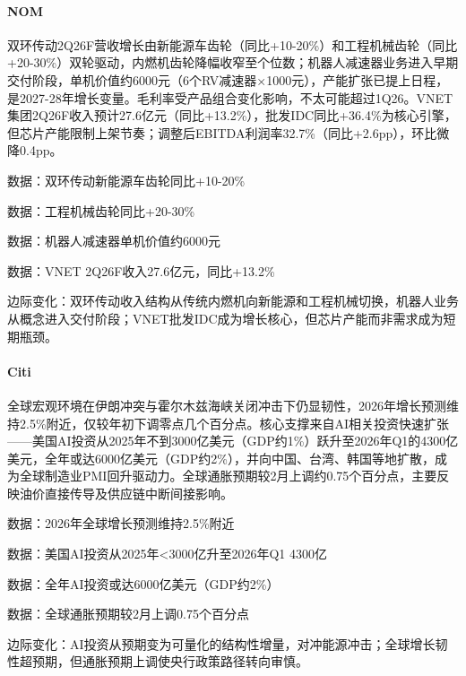 \documentclass[11pt]{ctexart}
\begin{document}
\paragraph{NOM} 双环传动2Q26F营收增长由新能源车齿轮（同比+10-20\%）和工程机械齿轮（同比+20-30\%）双轮驱动，内燃机齿轮降幅收窄至个位数；机器人减速器业务进入早期交付阶段，单机价值约6000元（6个RV减速器×1000元），产能扩张已提上日程，是2027-28年增长变量。毛利率受产品组合变化影响，不太可能超过1Q26。VNET集团2Q26F收入预计27.6亿元（同比+13.2\%），批发IDC同比+36.4\%为核心引擎，但芯片产能限制上架节奏；调整后EBITDA利润率32.7\%（同比+2.6pp），环比微降0.4pp。
{\small\color{refgray}数据：双环传动新能源车齿轮同比+10-20\%\par}
{\small\color{refgray}数据：工程机械齿轮同比+20-30\%\par}
{\small\color{refgray}数据：机器人减速器单机价值约6000元\par}
{\small\color{refgray}数据：VNET 2Q26F收入27.6亿元，同比+13.2\%\par}
{\small\color{refgray}边际变化：双环传动收入结构从传统内燃机向新能源和工程机械切换，机器人业务从概念进入交付阶段；VNET批发IDC成为增长核心，但芯片产能而非需求成为短期瓶颈。\par}
\paragraph{Citi} 全球宏观环境在伊朗冲突与霍尔木兹海峡关闭冲击下仍显韧性，2026年增长预测维持2.5\%附近，仅较年初下调零点几个百分点。核心支撑来自AI相关投资快速扩张——美国AI投资从2025年不到3000亿美元（GDP约1\%）跃升至2026年Q1的4300亿美元，全年或达6000亿美元（GDP约2\%），并向中国、台湾、韩国等地扩散，成为全球制造业PMI回升驱动力。全球通胀预期较2月上调约0.75个百分点，主要反映油价直接传导及供应链中断间接影响。
{\small\color{refgray}数据：2026年全球增长预测维持2.5\%附近\par}
{\small\color{refgray}数据：美国AI投资从2025年<3000亿升至2026年Q1 4300亿\par}
{\small\color{refgray}数据：全年AI投资或达6000亿美元（GDP约2\%）\par}
{\small\color{refgray}数据：全球通胀预期较2月上调0.75个百分点\par}
{\small\color{refgray}边际变化：AI投资从预期变为可量化的结构性增量，对冲能源冲击；全球增长韧性超预期，但通胀预期上调使央行政策路径转向审慎。\par}
\end{document}
